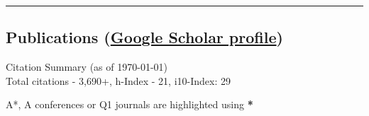 \documentclass[letter,10pt]{article}
\begin{document}
\ifcvshort\else
\vspace{0.5em}
\noindent\rule{\textwidth}{0.5pt}
\vspace{-0.2em}
\fi

\subsection*{\textbf{Publications} (\href{https://scholar.google.com/citations?user=rFGzHlIAAAAJ&hl=en}{Google Scholar profile})}
\vspace{-0.4em}

Citation Summary (as of \today)\\
Total citations - 3,690+, h-Index - 21, i10-Index: 29

A*, A conferences or Q1 journals are highlighted using \textbf{*}
\end{document}
